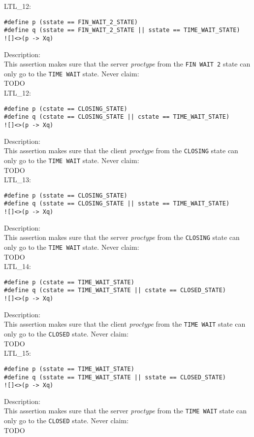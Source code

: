 \documentclass{WigReport}
\begin{document}
LTL\_12:\\
\begin{verbatim}
#define p (sstate == FIN_WAIT_2_STATE)
#define q (sstate == FIN_WAIT_2_STATE || sstate == TIME_WAIT_STATE)
![]<>(p -> Xq)
\end{verbatim}
Description:\\
This assertion makes sure that the server \textit{proctype} from the \verb|FIN WAIT 2| state can only go to the \verb|TIME WAIT| state.
Never claim:\\
TODO\\

LTL\_12:\\
\begin{verbatim}
#define p (cstate == CLOSING_STATE)
#define q (cstate == CLOSING_STATE || cstate == TIME_WAIT_STATE)
![]<>(p -> Xq)
\end{verbatim}
Description:\\
This assertion makes sure that the client \textit{proctype} from the \verb|CLOSING| state can only go to the \verb|TIME WAIT| state.
Never claim:\\
TODO\\

LTL\_13:\\
\begin{verbatim}
#define p (sstate == CLOSING_STATE)
#define q (sstate == CLOSING_STATE || sstate == TIME_WAIT_STATE)
![]<>(p -> Xq)
\end{verbatim}
Description:\\
This assertion makes sure that the server \textit{proctype} from the \verb|CLOSING| state can only go to the \verb|TIME WAIT| state.
Never claim:\\
TODO\\

LTL\_14:\\
\begin{verbatim}
#define p (cstate == TIME_WAIT_STATE)
#define q (cstate == TIME_WAIT_STATE || cstate == CLOSED_STATE)
![]<>(p -> Xq)
\end{verbatim}
Description:\\
This assertion makes sure that the client \textit{proctype} from the \verb|TIME WAIT| state can only go to the \verb|CLOSED| state.
Never claim:\\
TODO\\

LTL\_15:\\
\begin{verbatim}
#define p (sstate == TIME_WAIT_STATE)
#define q (sstate == TIME_WAIT_STATE || sstate == CLOSED_STATE)
![]<>(p -> Xq)
\end{verbatim}
Description:\\
This assertion makes sure that the server \textit{proctype} from the \verb|TIME WAIT| state can only go to the \verb|CLOSED| state.
Never claim:\\
TODO\\
\end{document}
